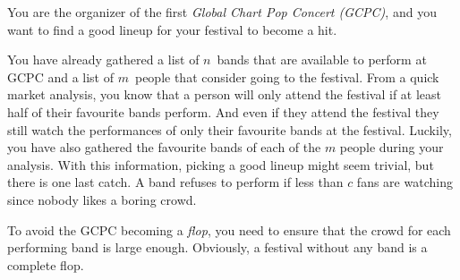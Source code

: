





You are the organizer of the first \emph{Global Chart Pop Concert (GCPC)}, and you want to find a good lineup for your festival to become a hit. 

You have already gathered a list of $n$~bands that are available to perform at GCPC and a list of $m$~people that consider going to the festival.
From a quick market analysis, you know that a person will only attend the festival if at least half of their favourite bands perform.
And even if they attend the festival they still watch the performances of only their favourite bands at the festival.
Luckily, you have also gathered the favourite bands of each of the $m$ people during your analysis.
With this information, picking a good lineup might seem trivial, but there is one last catch.
A band refuses to perform if less than $c$ fans are watching since nobody likes a boring crowd.

To avoid the GCPC becoming a \emph{flop}, you need to ensure that the crowd for each performing band is large enough.
Obviously, a festival without any band is a complete flop.

